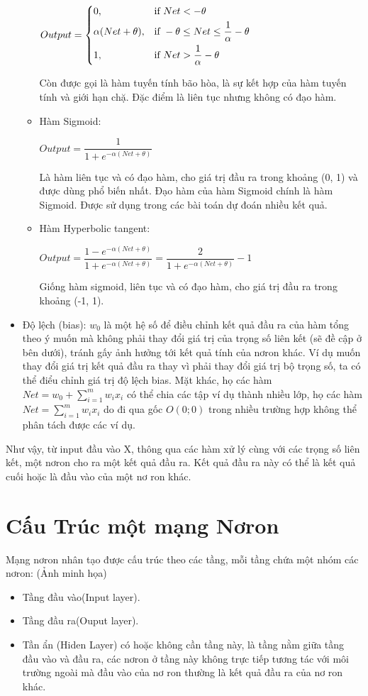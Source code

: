 \documentclass[13pt, a4paper]{extreport}
\begin{document}
\begin{itemize}
\begin{itemize}
     	  \begin{center}
			$Output = 
				\begin{dcases} 
					0, & \text{if } Net < -\theta \\
					\alpha(Net + \theta), & \text{if } -\theta \leq Net \leq \frac{1}{\alpha}-\theta\\
					1, & \text{if } Net > \frac{1}{\alpha}-\theta
				\end{dcases}$
		  \end{center}
		  Còn được gọi là  hàm tuyến tính bão hòa, là sự kết hợp của hàm tuyến tính và giới hạn chặ. Đặc điểm là liên tục nhưng không có đạo hàm.
		\item Hàm Sigmoid:
		  \begin{center}
			$Output = \dfrac{1}{1 + e^{-\alpha(Net + \theta)}}$
		  \end{center}
		  Là hàm liên tục và có đạo hàm, cho giá trị đầu ra trong khoảng (0, 1) và được dùng phổ biến nhất. Đạo hàm của hàm Sigmoid chính là hàm Sigmoid. Được sử dụng trong các bài toán dự đoán nhiều kết quả.
		\item Hàm Hyperbolic tangent:
		   \begin{center}
			$Output = \dfrac{1 - e^{-\alpha(Net + \theta)}}{1 + e^{-\alpha(Net + \theta)}}
					= \dfrac{2}{1 + e^{-\alpha(Net + \theta)}} - 1$
		  \end{center}  
		 Giống hàm sigmoid, liên tục và có đạo hàm, cho giá trị đầu ra trong khoảng (-1, 1).  
	\end{itemize}
	\item Độ lệch (bias): $w_0$ là một hệ số để điều chỉnh kết quả đầu ra của hàm tổng theo ý muốn mà không phải thay đổi giá trị của trọng số liên kết (sẽ đề cập ở bên dưới), tránh gấy ảnh hưởng tới kết quả tính của nơron khác. Ví dụ muốn thay đổi giá trị kết quả đầu ra thay vì phải thay đổi giá trị bộ trọng số, ta có thể điểu chỉnh giá trị độ lệch bias. Mặt khác, họ các hàm $Net = w_0 + \sum\limits_{i=1}^m w_ix_i$ có thể chia các tập ví dụ thành nhiều lớp, họ các hàm $Net = \sum\limits_{i=1}^m w_ix_i$ do đi qua gốc $O(0; 0)$ trong nhiều trường hợp không thể phân tách được các ví dụ.
\end{itemize}

\indent Như vậy, từ input đầu vào X, thông qua các hàm xử lý cùng với các trọng số liên kết, một nơron cho ra một kết quả đầu ra. Kết quả đầu ra này có thể là kết quả cuối hoặc là đầu vào của một nơ ron khác.
\section{Cấu Trúc một mạng Nơron}
\indent Mạng nơron nhân tạo được cấu trúc theo các tầng, mỗi tầng chứa một nhóm các nơron: (Ảnh minh họa)
\begin{itemize}
\item Tầng đầu vào(Input layer).
\item Tầng đầu ra(Ouput layer).
\item Tần ẩn (Hiden Layer) có hoặc không cần tầng này, là tầng nằm giữa tầng đầu vào và đầu ra, các nơron ở tầng này không trực tiếp tương tác với môi trường ngoài mà đầu vào của nơ ron thường là kết quả đầu ra của nơ ron khác.
\end{itemize}
\end{document}
